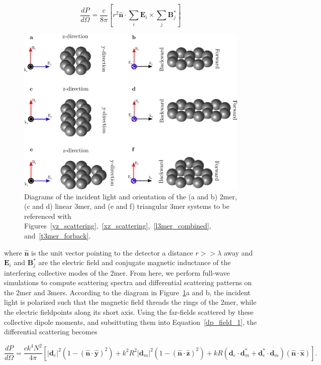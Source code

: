 \documentclass[journal=apchd5,manuscript=article]{achemso}
\begin{document}
\begin{equation}
\frac{dP}{d\Omega} = \frac{c}{8\pi}\left[r^2\hat{\textbf{n}}\cdot\sum_i\textbf{E}_i \times \sum_{j}\textbf{B}_{j}^*\right]
\label{dp_field_1}
\end{equation}


\begin{figure}
\includegraphics[width=5in]{scattering_diagrams.png}
\caption{Diagrams of the incident light and orientation of the (a and b) 2mer, (c and d) linear 3mer, and (e and f) triangular 3mer systems to be referenced with Figures~\ref{yz_scattering},~\ref{xz_scattering},~\ref{l3mer_combined}, and~\ref{t3mer_forback}.}
\label{diagrams}
\end{figure}


\noindent where $\hat{\textbf{n}}$ is the unit vector pointing to the detector a distance $r >> \lambda$ away and $\textbf{E}_i$ and $\textbf{B}_j^*$ are the electric field and conjugate magnetic inductance of the interfering collective modes of the 2mer. From here, we perform full-wave simulations to compute scattering spectra and differential scattering patterns on the 2mer and 3mers.\cite{Hohenester2012} According to the diagram in Figure~\ref{diagrams}a and b, the incident light is polarized such that the magnetic field threads the rings of the 2mer, while the electric fieldpoints along its short axis. Using the far-fields scattered by these collective dipole moments, and subsittuting them into Equation~\ref{dp_field_1}, the differential scattering becomes\cite{Engheta2006}

\begin{equation}
\frac{dP}{d\Omega} = \frac{ck^4N^2}{4\pi}\left[|\textbf{d}_{e}|^2(1-(\hat{\textbf{n}}\cdot\hat{\textbf{y}})^2) + k^2R^2|\textbf{d}_{m}|^2(1-(\hat{\textbf{n}}\cdot\hat{\textbf{z}})^2) + kR(\textbf{d}_{e}\cdot\textbf{d}_{m}^* +\textbf{d}_{e}^*\cdot\textbf{d}_{m})(\hat{\textbf{n}}\cdot\hat{\textbf{x}})\right].
\label{dp_dipoles_1}
\end{equation}
\end{document}
